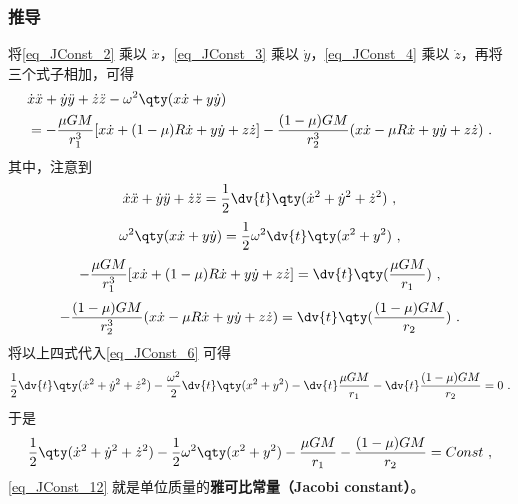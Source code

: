 \subsubsection{推导}
将\autoref{eq_JConst_2} 乘以 $\dot{x}$，\autoref{eq_JConst_3} 乘以 $\dot{y}$，\autoref{eq_JConst_4} 乘以 $\dot{z}$，再将三个式子相加，可得
\begin{equation}\label{eq_JConst_6} %
\begin{aligned}
&\dot{x} \ddot{x}+\dot{y}\ddot{y}+\dot{z}\ddot{z}-\omega^2\qty(x\dot{x}+y\dot{y})\\
&=-\frac{\mu GM}{r_1^3}[x\dot{x}+(1-\mu)R\dot{x}+y\dot{y}+z\dot{z}]-\frac{(1-\mu)GM}{r_2^3}(x\dot{x}-\mu R\dot{x}+y\dot{y}+z\dot{z})~.
\end{aligned}
\end{equation}
其中，注意到
\begin{equation}
\dot{x}\ddot{x}+\dot{y}\ddot{y}+\dot{z}\ddot{z} =\frac{1}{2}\dv{t}\qty(\dot{x}^2+\dot{y}^2+\dot{z}^2)~,
\end{equation}
\begin{equation}
\omega^2\qty(x\dot{x}+y\dot{y}) =\frac{1}{2}\omega^2\dv{t}\qty(x^2+y^2)~,
\end{equation}
\begin{equation}
-\frac{\mu GM}{r_1^3}[x\dot{x}+(1-\mu)R\dot{x}+y\dot{y}+z\dot{z}] = \dv{t}\qty(\frac{\mu GM}{r_1})~,
\end{equation}
\begin{equation}
-\frac{(1-\mu)GM}{r_2^3}(x\dot{x}-\mu R\dot{x}+y\dot{y}+z\dot{z}) = \dv{t}\qty(\frac{(1-\mu) GM}{r_2})~.
\end{equation}
将以上四式代入\autoref{eq_JConst_6} 可得
\begin{equation}%
\frac{1}{2}\dv{t}\qty(\dot{x}^2+\dot{y}^2+\dot{z}^2)-\frac{\omega^2}{2}\dv{t}\qty(x^2+y^2)-\dv{t}\frac{\mu GM}{r_1}-\dv{t}\frac{(1-\mu) GM}{r_2}=0~.
\end{equation}
于是
\begin{equation}\label{eq_JConst_12} %
\frac{1}{2}\qty(\dot{x}^2+\dot{y}^2+\dot{z}^2)-\frac{1}{2}\omega^2\qty(x^2+y^2)-\frac{\mu GM}{r_1}-\frac{(1-\mu) GM}{r_2}=Const~,
\end{equation}
\autoref{eq_JConst_12} 就是单位质量的\textbf{雅可比常量（Jacobi constant）}。
